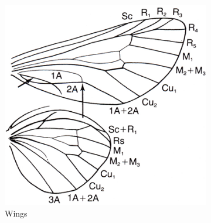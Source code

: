 \documentclass[letterpaper, 11pt]{article}
\begin{document}
\begin{figure}[ht!]
    \centering
    \begin{subfigure}[ht!]{0.36\textwidth}
        \includegraphics[width=\textwidth]{image39}
        \caption{Wings}
        \label{fig:psychid1}
    \end{subfigure}
    ~ %
    \begin{subfigure}[ht!]{0.15\textwidth}

\end{subfigure}
\end{figure}
\end{document}
